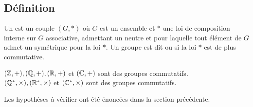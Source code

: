 \documentclass{book}
\begin{document}
\subsection{Définition}
\begin{Definition}[Groupe]
Un  est un couple $(G,\ast)$ où $G$ est un ensemble et $\ast$ une loi de composition interne sur $G$ associative, admettant un neutre et pour laquelle tout élément de $G$ admet un symétrique pour la loi $\ast$.
Un groupe est dit  ou  si la loi $\ast$ est de plus commutative.
\end{Definition}
\begin{Proposition}
$(\mathbb{Z}, +), (\mathbb{Q}, +), (\mathbb{R}, +)$ et  $(\mathbb{C}, +)$  sont des groupes commutatifs.\\
$(\mathbb{Q}^*, \times), (\mathbb{R}^*, \times)$ et  $(\mathbb{C}^*,\times)$  sont des groupes commutatifs.\\ 
\end{Proposition}
\begin{Demonstration}
Les hypothèses à vérifier ont été énoncées dans la section précédente.
\end{Demonstration}
\end{document}
